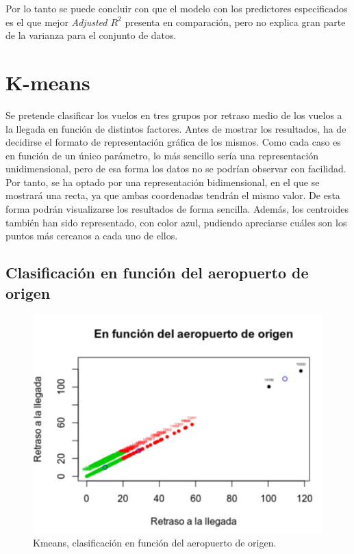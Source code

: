 \documentclass{article}
\begin{document}
Por lo tanto se puede concluir con que el modelo con los predictores especificados es el que mejor \textit{Adjusted $R^2$} presenta en comparación, pero no explica gran parte de la varianza para el conjunto de datos.\\


\newpage
\section{K-means}

Se pretende clasificar los vuelos en tres grupos por retraso medio de los vuelos a la llegada en función de distintos factores. Antes de mostrar los resultados, ha de decidirse el formato de representación gráfica de los mismos. Como cada caso es en función de un único parámetro, lo más sencillo sería una representación unidimensional, pero de esa forma los datos no se podrían observar con facilidad. Por tanto, se ha optado por una representación bidimensional, en el que se mostrará una recta, ya que ambas coordenadas tendrán el mismo valor. De esta forma podrán visualizarse los resultados de forma sencilla. Además, los centroides también han sido representado, con color azul, pudiendo apreciarse cuáles son los puntos más cercanos a cada uno de ellos.\\


\subsection{Clasificación en función del aeropuerto de origen}

\begin{figure}[H]
    \centering
    \includegraphics[width=0.7\columnwidth]{images/KMEANS/Origen.png}
    \caption{Kmeans, clasificación en función del aeropuerto de origen. }
    \label{fig:origen}
\end{figure}
\end{document}
